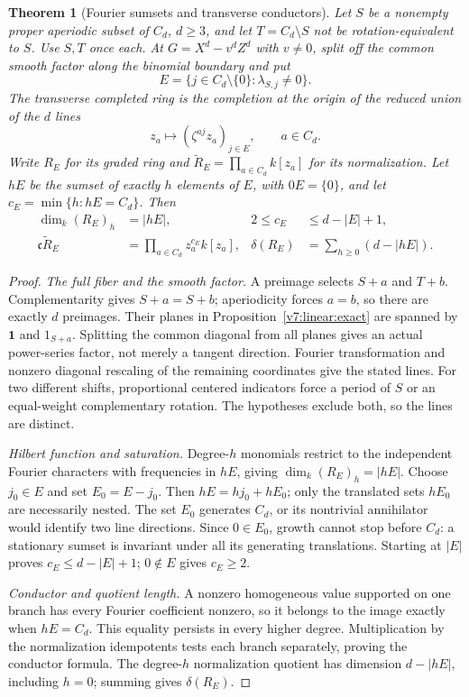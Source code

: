 \documentclass[10pt,fleqn]{article}
\numberwithin{equation}{section}
\newtheorem{theorem}{Theorem}[section]
\begin{document}
\begin{theorem}[Fourier sumsets and transverse conductors]
\label{v7:linear:sumsets}
Let $S$ be a nonempty proper aperiodic subset of $C_d$, $d\ge3$, and let
$T=C_d\setminus S$ not be rotation-equivalent to $S$.
Use $S,T$ once each.  At $G=X^d-v^dZ^d$ with $v\ne0$,
split off the common smooth factor along the binomial boundary and put
\[
 E=\{j\in C_d\setminus\{0\}:\lambda_{S,j}\ne0\}.
\]
The transverse completed ring is the completion at the origin of the
reduced union of the $d$ lines
\[
 z_a\longmapsto(\zeta^{aj}z_a)_{j\in E},\qquad a\in C_d.
\]
Write $R_E$ for its graded ring and $\widetilde R_E=\prod_{a\in C_d}k[z_a]$
for its normalization.  Let $hE$ be the sumset of exactly $h$ elements
of $E$, with $0E=\{0\}$, and let $c_E=\min\{h:hE=C_d\}$.
Then
\begin{align*}
 \dim_k(R_E)_h&=|hE|, &2\le c_E&\le d-|E|+1,\\
 \mathfrak c\widetilde R_E&=
       \prod_{a\in C_d}z_a^{c_E}k[z_a],&
 \delta(R_E)&=\sum_{h\ge0}(d-|hE|).
\end{align*}
\end{theorem}
\begin{proof}
\emph{The full fiber and the smooth factor.}
A preimage selects $S+a$ and $T+b$.  Complementarity gives $S+a=S+b$;
aperiodicity forces $a=b$, so there are exactly $d$ preimages.
Their planes in Proposition~\ref{v7:linear:exact} are spanned by
$\mathbf 1$ and $1_{S+a}$.  Splitting the common diagonal from all planes
gives an actual power-series factor, not merely a tangent direction.
Fourier transformation and nonzero diagonal rescaling of the remaining
coordinates give the stated lines.  For two different shifts, proportional
centered indicators force a period of $S$ or an equal-weight complementary
rotation.  The hypotheses exclude both, so the lines are distinct.

\emph{Hilbert function and saturation.}
Degree-$h$ monomials restrict to the independent Fourier characters
with frequencies in $hE$, giving $\dim_k(R_E)_h=|hE|$.
Choose $j_0\in E$ and set $E_0=E-j_0$.  Then $hE=hj_0+hE_0$;
only the translated sets $hE_0$ are necessarily nested.
The set $E_0$ generates $C_d$, or its nontrivial annihilator would
identify two line directions.  Since $0\in E_0$, growth cannot stop
before $C_d$: a stationary sumset is invariant under all its generating
translations.  Starting at $|E|$ proves $c_E\le d-|E|+1$;
$0\notin E$ gives $c_E\ge2$.

\emph{Conductor and quotient length.}
A nonzero homogeneous value supported on one branch has every Fourier
coefficient nonzero, so it belongs to the image exactly when $hE=C_d$.
This equality persists in every higher degree.  Multiplication by the
normalization idempotents tests each branch separately, proving the
conductor formula.  The degree-$h$ normalization quotient has dimension
$d-|hE|$, including $h=0$; summing gives $\delta(R_E)$.
\end{proof}
\end{document}
